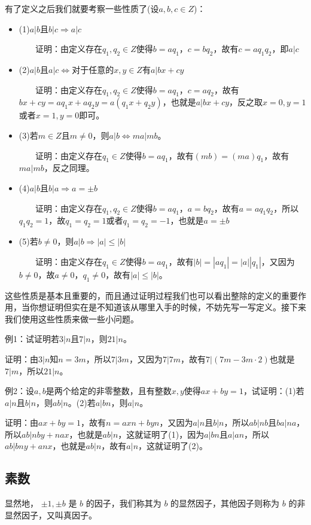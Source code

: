 \documentclass[12pt, a4paper, oneside]{ctexart}
\begin{document}
有了定义之后我们就要考察一些性质了(设$a,b,c\in Z$)：
\begin{itemize}
\item (1)$a|b$且$b|c\Rightarrow a|c$

$\;\;\;\;\;\;\;$证明：由定义存在$q_1,q_2\in Z$使得$b=aq_1$，$c=bq_2$，故有$c=aq_1q_2$，即$a|c$
\item (2)$a|b$且$a|c\Leftrightarrow $对于任意的$x,y\in Z$有$a|bx+cy$

$\;\;\;\;\;\;\;$证明：由定义存在$q_1,q_2\in Z$使得$b=aq_1$，$c=aq_2$，故有$bx+cy=aq_1x+aq_2y=a(q_1x+q_2y)$，也就是$a|bx+cy$，反之取$x=0,y=1$或者$x=1,y=0$即可。
\item (3)若$m\in Z$且$m\neq0$，则$a|b\Leftrightarrow ma|mb$。

$\;\;\;\;\;\;\;$证明：由定义存在$q_1\in Z$使得$b=aq_1$，故有$(mb)=(ma)q_1$，故有$ma|mb$，反之同理。
\item (4)$a|b$且$b|a\Rightarrow a=\pm b$

$\;\;\;\;\;\;\;$证明：由定义存在$q_1,q_2\in Z$使得$b=aq_1$，$a=bq_2$，故有$a=aq_1q_2$，所以$q_1q_2=1$，故$q_1=q_2=1$或者$q_1=q_2=-1$，也就是$a=\pm b$

\item (5)若$b\neq 0$，则$a|b\Rightarrow |a|\leqslant |b|$

$\;\;\;\;\;\;\;$证明：由定义存在$q_1\in Z$使得$b=aq_1$，故有$|b|=|aq_1|=|a||q_1|$，又因为$b\neq 0$，故$a\neq 0$，$q_1\neq 0$，故有$|a|\leqslant |b|$。
\end{itemize}
这些性质是基本且重要的，而且通过证明过程我们也可以看出整除的定义的重要作用，当你想证明但实在是不知道该从哪里入手的时候，不妨先写一写定义。接下来我们使用这些性质来做一些小问题。

例1：试证明若$3|n$且$7|n$，则$21|n$。

证明：由$3|n$知$n=3m$，所以$7|3m$，又因为$7|7m$，故有$7|(7m-3m\cdot 2)$也就是$7|m$，所以$21|n$。

例2：设$a,b$是两个给定的非零整数，且有整数$x,y$使得$ax+by=1$，试证明：(1)若$a|n$且$b|n$，则$ab|n$。(2)若$a|bn$，则$a|n$。

证明：由$ax+by=1$，故有$n=axn+byn$，又因为$a|n$且$b|n$，所以$ab|nb$且$ba|na$，所以$ab|nby+nax$，也就是$ab|n$，这就证明了(1)，因为$a|bn$且$a|an$，所以$ab|bny+anx$，也就是$ab|n$，故有$a|n$，这就证明了(2)。

\subsection*{素数}
显然地， $\pm1,\pm b$ 是 $b$ 的因子，我们称其为 $b$ 的显然因子，其他因子则称为 $b$ 的非显然因子，又叫真因子。
\end{document}
